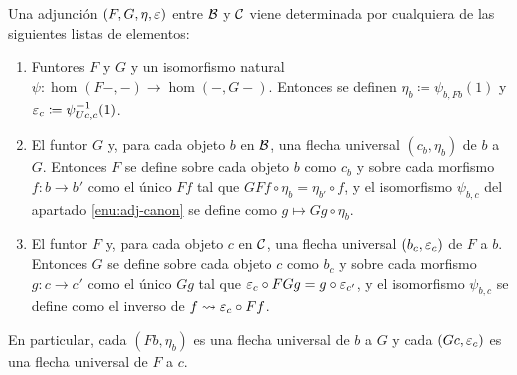 \begin{theorem}\label{thm:adjoint-elems}
  Una adjunción $(F,G,\eta,\varepsilon)$ entre $\mathcal{B}$ y $\mathcal{C}$ viene determinada por
  cualquiera de las siguientes listas de elementos:
  \begin{enumerate}
  \item \label{enu:adj-canon} Funtores $F$ y $G$ y un isomorfismo natural
    $\psi:\hom(F-,-)\to\hom(-,G-)$. Entonces se definen
    $\eta_b\coloneqq\psi_{b,Fb}(1)$ y $\varepsilon_c\coloneqq\psi_{Uc,c}^{-1}(1)$.
  \item \label{enu:adj-univ} El funtor $G$ y, para cada objeto $b$ en $\mathcal{B}$, una
    flecha universal $(c_b,\eta_b)$ de $b$ a $G$. Entonces $F$ se define sobre
    cada objeto $b$ como $c_b$ y sobre cada morfismo $f:b\to b'$ como el único
    $Ff$ tal que $GFf\circ\eta_b=\eta_{b'}\circ f$, y el isomorfismo
    $\psi_{b,c}$ del apartado \ref{enu:adj-canon} se define como
    $g\mapsto Gg\circ\eta_b$.
  \item \label{enu:adj-couniv} El funtor $F$ y, para cada objeto $c$ en $\mathcal{C}$,
    una flecha universal $(b_c,\varepsilon_c)$ de $F$ a $b$. Entonces $G$ se define
    sobre cada objeto $c$ como $b_c$ y sobre cada morfismo $g:c\to c'$ como el
    único $Gg$ tal que $\varepsilon_c\circ FGg=g\circ\varepsilon_{c'}$, y el isomorfismo
    $\psi_{b,c}$ se define como el inverso de $f\rightsquigarrow\varepsilon_c\circ Ff$.
  \end{enumerate}
  En particular, cada $(Fb,\eta_b)$ es una flecha universal de $b$ a $G$ y cada
  $(Gc,\varepsilon_c)$ es una flecha universal de $F$ a $c$.
\end{theorem}
